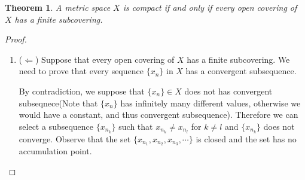 \documentclass[12pt,leqno]{amsart}
\newtheorem{theorem}{Theorem}[section]
\theoremstyle{definition}
\numberwithin{equation}{subsection}
\begin{document}
\begin{theorem}\label{finitcover}
A metric space $X$ is compact if and only if every open covering of $X$ has a finite subcovering.
\end{theorem}
\begin{proof}
~\begin{enumerate}
    \item ($\Leftarrow$) Suppose that every open covering of $X$ has a finite subcovering. We need to prove that every sequence $\{x_n\}$ in $X$ has a convergent subsequence. 
    
    By contradiction, we suppose that $\{x_n\}\in X$ does not has convergent subseqnece(Note that $\{x_n\}$ has infinitely many different values, otherwise we would have a constant, and thus convergent subsequence). Therefore we can select a subsequence $\{x_{n_k}\}$ such that $x_{n_k} \neq x_{n_l}$ for $k\neq l$ and $\{x_{n_k}\}$ does not converge. Observe that the set $\{x_{n_1},x_{n_2},x_{n_3},\cdots\}$ is closed and the set has no accumulation point.
    

\end{enumerate}
\end{proof}
\end{document}
